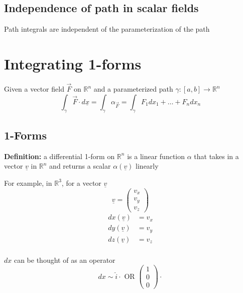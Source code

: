 \subsection{Independence of path in scalar fields}

Path integrals are independent of the parameterization of the path

\section{Integrating 1-forms}

\begin{framed}
   Given a vector field $ \vec{F}$ on $ \mathbb{R}^n$ and a parameterized path $ \gamma: [a,b] \rightarrow \mathbb{R}^n$  
   \[
      \int_{\gamma} \vec{F} \cdot d \underline{x} = \int_{\gamma} \alpha_{\vec{F} } = \int_{\gamma} F_1 dx_1 + \hdots + F_n dx_n
   \]  
\end{framed} 

\subsection{1-Forms}

\begin{framed}
   \textbf{Definition:} a differential 1-form on $ \mathbb{R}^n$ is a linear function $\alpha$ that takes in a vector $ \underline{v}$ in $ \mathbb{R}^n$ and returns a scalar $ \alpha( \underline{v})$ linearly
\end{framed}


For example, in $ \mathbb{R}^3$, for a vector $ \underline{v}$ 
\[
  \underline{v} = \begin{pmatrix} v_x \\ v_y \\ v_z \end{pmatrix} 
\] 
\begin{align*}
   dx \left( \underline{v} \right) & = v_x  \\
   dy \left( \underline{v} \right) & = v_y  \\
   dz \left( \underline{v} \right) & = v_z  \\
\end{align*}

$dx$ can be thought of as an operator
\[
   dx \sim \hat{i} \cdot \text{ OR } \begin{pmatrix} 1 \\ 0 \\ 0 \end{pmatrix} \cdot 
\] 

